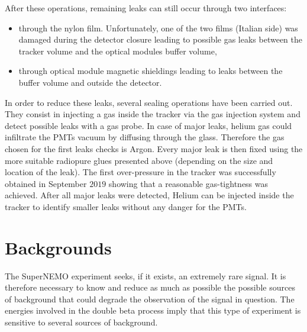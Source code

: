 After these operations, remaining leaks can still occur through two interfaces:
\begin{itemize}
\item through the nylon film.
  Unfortunately, one of the two films (Italian side) was damaged during the detector closure leading to possible gas leaks between the tracker volume and the optical modules buffer volume,
\item through optical module magnetic shieldings leading to leaks between the buffer volume and outside the detector.
\end{itemize}
In order to reduce these leaks, several sealing operations have been carried out.
They consist in injecting a gas inside the tracker via the gas injection system and detect possible leaks with a gas probe.
In case of major leaks, helium gas could infiltrate the PMTs vacuum by diffusing through the glass.
Therefore the gas chosen for the first leaks checks is Argon.
Every major leak is then fixed using the more suitable radiopure glues presented above (depending on the size and location of the leak).
The first over-pressure in the tracker was successfully obtained in September $2019$ showing that a reasonable gas-tightness was achieved.
After all major leaks were detected, Helium can be injected inside the tracker to identify smaller leaks without any danger for the PMTs.




\section{Backgrounds}
\label{sec:SNbkg}

The SuperNEMO experiment seeks, if it exists, an extremely rare signal.
It is therefore necessary to know and reduce as much as possible the possible sources of background that could degrade the observation of the signal in question.
The energies involved in the double beta process imply that this type of experiment is sensitive to several sources of background.

